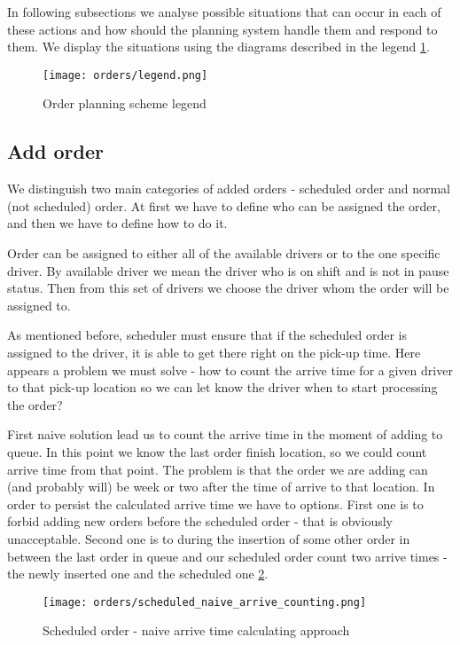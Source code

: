 In following subsections we analyse possible situations that can occur in each of these actions and how should the planning system handle them and respond to them. We display the situations using the diagrams described in the legend \ref{order-planning-legend}.

\begin{figure}[h]\centering
	\texttt{[image: orders/legend.png]}
	\caption{Order planning scheme legend}\label{order-planning-legend}
\end{figure} 



\subsection{Add order}
We distinguish two main categories of added orders - scheduled order and normal (not scheduled) order. At first we have to define who can be assigned the order, and then we have to define how to do it.

Order can be assigned to either all of the available drivers or to the one specific driver. By available driver we mean the driver who is on shift and is not in pause status. Then from this set of drivers we choose the driver whom the order will be assigned to.

As mentioned before, scheduler must ensure that if the scheduled order is assigned to the driver, it is able to get there right on the pick-up time. Here appears a problem we must solve - how to count the arrive time for a given driver to that pick-up location so we can let know the driver when to start processing the order?

First naive solution lead us to count the arrive time in the moment of adding to queue. In this point we know the last order finish location, so we could count arrive time from that point. The problem is that the order we are adding can (and probably will) be week or two after the time of arrive to that location. In order to persist the calculated arrive time we have to options. First one is to forbid adding new orders before the scheduled order - that is obviously unacceptable. Second one is to during the insertion of some other order in between the last order in queue and our scheduled order count two arrive times - the newly inserted one and the scheduled one \ref{scheduled_naive_arrive_counting}. 

\begin{figure}[h]\centering
	\texttt{[image: orders/scheduled\_naive\_arrive\_counting.png]}
	\caption{Scheduled order - naive arrive time calculating approach} 
	\label{scheduled_naive_arrive_counting}
\end{figure} 

